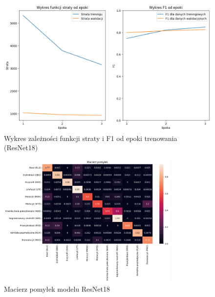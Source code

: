 \begin{figure}
    \centering
    \includegraphics[width=\textwidth]{experiments/resnet18/combined}
    \caption{Wykres zależności funkcji straty i F1 od epoki trenowania (ResNet18)}
    \label{fig:plot_resnet18}
\end{figure}
\begin{figure}
    \centering
    \includegraphics[width=0.8\textwidth]{experiments/resnet18/confusion_matrix}
    \caption{Macierz pomyłek modelu ResNet18}
    \label{fig:confusion_resnet18}
\end{figure}

